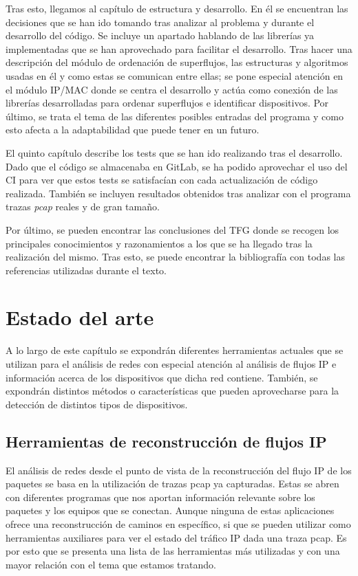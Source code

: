 \documentclass[twoside, 12pt]{epstfg}
\begin{document}
Tras esto, llegamos al capítulo de estructura y desarrollo. En él se encuentran las decisiones que se han ido tomando tras analizar al problema y durante el desarrollo del código. Se incluye un apartado hablando de las librerías ya implementadas que se han aprovechado para facilitar el desarrollo. Tras hacer una descripción del módulo de ordenación de superflujos, las estructuras y algoritmos usadas en él y como estas se comunican entre ellas; se pone especial atención en el módulo IP/MAC donde se centra el desarrollo y actúa como conexión de las librerías desarrolladas para ordenar superflujos e identificar dispositivos. Por último, se trata el tema de las diferentes posibles entradas del programa y como esto afecta a la adaptabilidad que puede tener en un futuro.

El quinto capítulo describe los tests que se han ido realizando tras el desarrollo. Dado que el código se almacenaba en GitLab, se ha podido aprovechar el uso del CI para ver que estos tests se satisfacían con cada actualización de código realizada. También se incluyen resultados obtenidos tras analizar con el programa trazas \textit{pcap} reales y de gran tamaño.

Por último, se pueden encontrar las conclusiones del TFG donde se recogen los principales conocimientos y razonamientos a los que se ha llegado tras la realización del mismo. Tras esto, se puede encontrar la bibliografía con todas las referencias utilizadas durante el texto.

\chapter{Estado del arte}
A lo largo de este capítulo se expondrán diferentes herramientas actuales que se utilizan para el análisis de redes con especial atención al análisis de flujos IP e información acerca de los dispositivos que dicha red contiene. También, se expondrán distintos métodos o características que pueden aprovecharse para la detección de distintos tipos de dispositivos.

\section{Herramientas de reconstrucción de flujos IP}
El análisis de redes desde el punto de vista de la reconstrucción del flujo IP de los paquetes se basa en la utilización de trazas pcap ya capturadas. Estas se abren con diferentes programas que nos aportan información relevante sobre los paquetes y los equipos que se conectan. Aunque ninguna de estas aplicaciones ofrece una reconstrucción de caminos en específico, si que se pueden utilizar como herramientas auxiliares para ver el estado del tráfico IP dada una traza pcap. Es por esto que se presenta una lista de las herramientas más utilizadas y con una mayor relación con el tema que estamos tratando. \cite{Gandhi2014}
\end{document}
